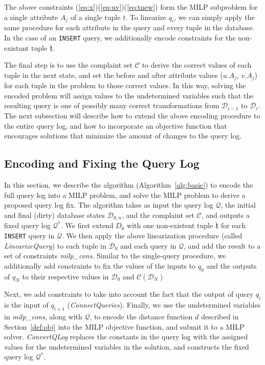 The above constraints (\ref{eq:x})(\ref{eq:uv})(\ref{eq:tnew})
form the MILP subproblem for a single attribute $A_j$ of a single tuple $t$.
To linearize $q_i$, we can simply apply the same procedure for each attribute in the 
query and every tuple in the database.
In the case of an \texttt{INSERT} query, we additionally encode constraints for
the non-existant tuple $\bcancel{t}$.

The final step is to use the complaint set $\mathcal{C}$ to derive the correct values
of each tuple in the next state, and set the before and after attribute values ($u.A_j$, $v.A_j$)
for each tuple in the problem to those correct values.
In this way, solving the encoded problem will assign values to the undetermined variables
such that the resulting query is one of possibly many correct transformations from 
$\mathcal{D}_{i-1}$ to $\mathcal{D}_i$.
The next subsection will describe how to extend the above encoding procedure to the 
entire query log, and how to incorporate an objective function that encourages solutions
that minimize the amount of changes to the query log.






\subsection{Encoding and Fixing the Query Log}
\label{sec:milp}

In this section, we describe the algorithm (Algorithm~\ref{alg:basic}) to encode 
the full query log into a MILP problem, and solve the MILP problem to derive a proposed query log fix.
The algorithm takes as input the query log $\mathcal{Q}$, the initial and final (dirty) database states 
$\mathcal{D}_{0, n}$, and the complaint set $\mathcal{C}$, and outputs a fixed query 
log $\mathcal{Q}^*$.  We first extend $D_0$ with one non-existent tuple $\bcancel{t}$
for each \texttt{INSERT} query in $\mathcal{Q}$.
We then apply the above linearization procedure (called \textit{LinearizeQuery})
to each tuple in $\mathcal{D}_0$ and each query in $\mathcal{Q}$, 
and add the result to a set of constraints \textit{milp\_cons}.
Similar to the single-query procedure, we additionally add constraints to fix the
values of the inputs to $q_0$ and the outputs of $q_N$ to their respective values in
$\mathcal{D}_0$ and $\mathcal{C}(\mathcal{D}_N)$

Next, we add constraints to take into account the fact that the output of 
query $q_i$ is the input of $q_{i+1}$ (\textit{ConnectQueries}).
Finally, we use the undetermined variables in \textit{milp\_cons}, along with $\mathcal{Q}$,
to encode the distance function $d$ described in Section~\ref{def:obj} 
into the MILP objective function, and submit it to a MILP solver.
\textit{ConvertQLog} replaces the constants in the query log with the 
assigned values for the undetermined variables in the solution, and constructs
the fixed query log $\mathcal{Q}^*$.



